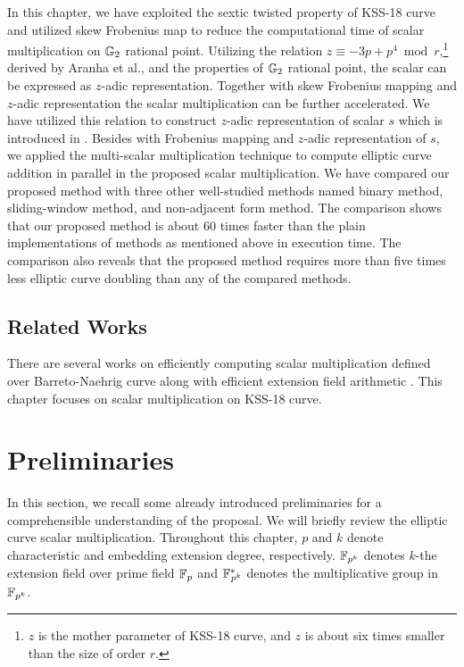 In this chapter, we have exploited the sextic twisted property of KSS-18 curve and utilized skew Frobenius map to reduce the computational time of scalar multiplication on ${\mathbb{G}}_{2}$ rational point. 
Utilizing the relation $z \equiv -3p + p^4 \bmod {r}$,\footnote{$z$ is the mother parameter of KSS-18 curve, and $z$ is about six times smaller than the size of order $r$.} derived by Aranha et al.,\cite{PAIRING:AFKMR12} and the properties of ${\mathbb{G}}_{2}$ rational point, the scalar can be expressed as $z$-adic representation.
Together with skew Frobenius mapping and $z$-adic representation the scalar multiplication can be further accelerated.  
We have utilized this relation to construct $z$-adic representation of scalar $s$ which is introduced in . 
Besides with Frobenius mapping and $z$-adic representation of $s$, we applied the multi-scalar multiplication technique to compute elliptic curve addition in parallel in the proposed scalar multiplication.
We have compared our proposed method with three other well-studied methods named binary method, sliding-window method, and non-adjacent form method. 
The comparison shows that our proposed method is about 60 times faster than the plain implementations of methods as mentioned above in execution time. The comparison also reveals that the proposed method requires more than five times less elliptic curve doubling than any of the compared methods.

\subsection{Related Works} 
There are several works \cite{DBLP:journals/ieicet/NogamiSONAM09}\cite{CANS:SNOKM08} on efficiently computing scalar multiplication defined over Barreto-Naehrig\cite{SAC:BarNae05} curve along with efficient extension field arithmetic \cite{C:BaiPaa98}. 
This chapter focuses on scalar multiplication on KSS-18 curve.


\section{Preliminaries}
In this section, we recall some already introduced preliminaries for a comprehensible understanding of the proposal. 
We will briefly review the elliptic curve scalar multiplication. 
Throughout this chapter, $p$ and $k$ denote characteristic and embedding extension degree, respectively. $\mathbb{F}_{p^k}$ denotes $k$-the extension field over prime field ${\mathbb{F}}_{p}$ and ${{\mathbb{F}}^{\ast}}_{\!\!\!p^{k}}$ denotes the multiplicative group in $\mathbb{F}_{p^k}$.

